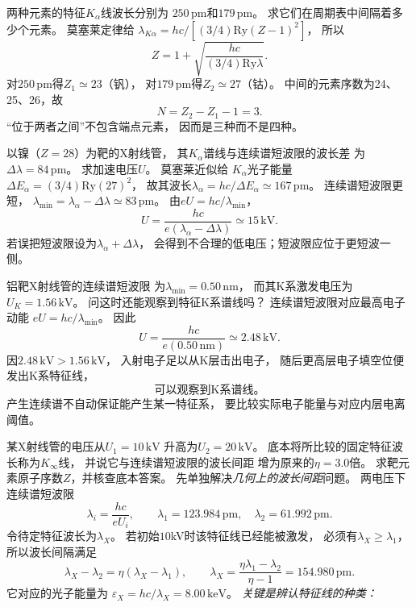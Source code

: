 两种元素的特征$K_\alpha$线波长分别为
$250\,\mathrm{pm}$和$179\,\mathrm{pm}$。
求它们在周期表中间隔着多少个元素。
\exsolution
莫塞莱定律给
$\lambda_{K\alpha}=hc/[(3/4)\mathrm{Ry}(Z-1)^2]$，
所以
\[
 Z=1+\sqrt{\frac{hc}{(3/4)\mathrm{Ry}\lambda}}.
\]
对$250\,\mathrm{pm}$得$Z_1\simeq23$（钒），
对$179\,\mathrm{pm}$得$Z_2\simeq27$（钴）。
中间的元素序数为24、25、26，故
\[
 \boxed{N=Z_2-Z_1-1=3}.
\]
\excheck “位于两者之间”不包含端点元素，
因而是三种而不是四种。

以镍（$Z=28$）为靶的X射线管，
其$K_\alpha$谱线与连续谱短波限的波长差
为$\Delta\lambda=84\,\mathrm{pm}$。
求加速电压$U$。
\exsolution
莫塞莱近似给
$K_\alpha$光子能量
$\Delta E_\alpha=(3/4)\mathrm{Ry}(27)^2$，
故其波长$\lambda_\alpha=hc/\Delta E_\alpha
\simeq167\,\mathrm{pm}$。
连续谱短波限更短，
$\lambda_{\min}=\lambda_\alpha-\Delta\lambda
\simeq83\,\mathrm{pm}$。
由$eU=hc/\lambda_{\min}$，
\[
 \boxed{U=\frac{hc}{e(\lambda_\alpha-\Delta\lambda)}
 \simeq15\,\mathrm{kV}}.
\]
\excheck 若误把短波限设为$\lambda_\alpha+\Delta\lambda$，
会得到不合理的低电压；短波限应位于更短波一侧。

铝靶X射线管的连续谱短波限
为$\lambda_{\min}=0.50\,\mathrm{nm}$，
而其K系激发电压为$U_K=1.56\,\mathrm{kV}$。
问这时还能观察到特征K系谱线吗？
\exsolution
连续谱短波限对应最高电子动能
$eU=hc/\lambda_{\min}$。
因此
\[
 U=\frac{hc}{e(0.50\,\mathrm{nm})}
 \simeq2.48\,\mathrm{kV}.
\]
因$2.48\,\mathrm{kV}>1.56\,\mathrm{kV}$，
入射电子足以从K层击出电子，
随后更高层电子填空位便发出K系特征线，
\[
 \boxed{\text{可以观察到K系谱线。}}
\]
\excheck 产生连续谱不自动保证能产生某一特征系，
要比较实际电子能量与对应内层电离阈值。

某X射线管的电压从$U_1=10\,\mathrm{kV}$
升高为$U_2=20\,\mathrm{kV}$。
底本将所比较的固定特征波长称为$K_\infty$线，
并说它与连续谱短波限的波长间距
增为原来的$\eta=3.0$倍。
求靶元素原子序数$Z$，并核查底本答案。
\exsolution
先单独解决\emph{几何上的波长间距}问题。
两电压下连续谱短波限
\[
 \lambda_i=\frac{hc}{eU_i},\qquad
 \lambda_1=123.984\,\mathrm{pm},\quad
 \lambda_2=61.992\,\mathrm{pm}.
\]
令待定特征波长为$\lambda_X$。
若初始$10$kV时该特征线已经能被激发，
必须有$\lambda_X\ge\lambda_1$，
所以波长间隔满足
\[
 \lambda_X-\lambda_2
 =\eta(\lambda_X-\lambda_1),\qquad
 \boxed{\lambda_X=
 \frac{\eta\lambda_1-\lambda_2}{\eta-1}
 =154.980\,\mathrm{pm}}.
\]
它对应的光子能量为
$\varepsilon_X=hc/\lambda_X=8.00\,\mathrm{keV}$。
\emph{关键是辨认特征线的种类：}

